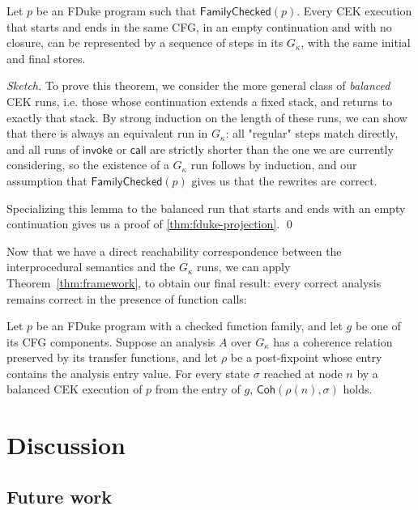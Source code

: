 \documentclass[runningheads]{llncs}
\newcommand{\coh}{\mathsf{Coh}}
\newcommand{\kcall}{\mathsf{call}}
\newcommand{\kinvoke}{\mathsf{invoke}}
\newcommand{\FamilyChecked}{\mathsf{FamilyChecked}}
\newcommand{\Gk}{G_\kappa}
\begin{document}
\begin{theorem}\label{thm:fduke-projection}
Let $p$ be an FDuke program such that $\FamilyChecked(p)$. Every CEK execution that starts and ends in the same CFG, in an empty continuation and with no closure, can be represented by a sequence of steps in its $\Gk$, with the same initial and final stores.
\end{theorem}

\begin{proof}[Sketch]
To prove this theorem, we consider the more general class of \emph{balanced} CEK runs, i.e. those whose continuation extends a fixed stack, and returns to exactly that stack. By strong induction on the length of these runs, we can show that there is always an equivalent run in $\Gk$: all "regular" steps match directly, and all runs of $\kinvoke$ or $\kcall$ are strictly shorter than the one we are currently considering, so the existence of a $\Gk$ run follows by induction, and our assumption that $\FamilyChecked(p)$ gives us that the rewrites are correct.

Specializing this lemma to the balanced run that starts and ends with an empty continuation gives us a proof of \ref{thm:fduke-projection}. \qed
\end{proof}

Now that we have a direct reachability correspondence between the interprocedural semantics and the $\Gk$ runs, we can apply Theorem~\ref{thm:framework}, to obtain our final result: every correct analysis remains correct in the presence of function calls:

\begin{theorem}\label{thm:fduke}
Let $p$ be an FDuke program with a checked function family, and let $g$ be one of its CFG components. Suppose an analysis $A$ over $\Gk$ has a coherence relation preserved by its transfer functions, and let $\rho$ be a post-fixpoint whose entry contains the analysis entry value. For every state $\sigma$ reached at node $n$ by a balanced CEK execution of $p$ from the entry of $g$, $\coh(\rho(n), \sigma)$ holds.
\end{theorem}

\section{Discussion}
\label{sec:discuss}

\subsection{Future work}
\end{document}
